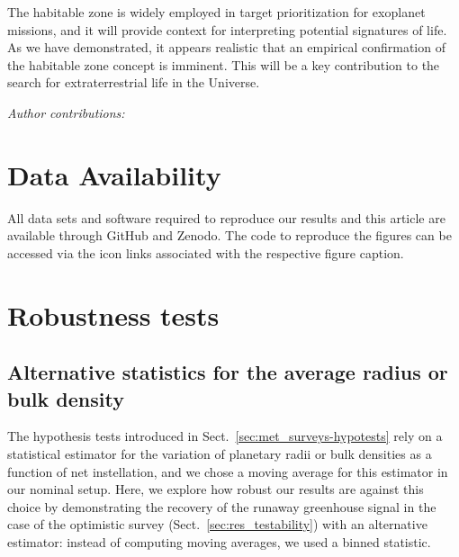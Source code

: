 \documentclass[twocolumn]{aastex631}
\begin{document}
The habitable zone is widely employed in target prioritization for exoplanet missions, and it will provide context for interpreting potential signatures of life.
As we have demonstrated, it appears realistic that an empirical confirmation of the habitable zone concept is imminent.
This will be a key contribution to the search for extraterrestrial life in the Universe.


\begin{large}\textit{Author contributions:}\end{large}

\section*{Data Availability}
All data sets and software required to reproduce our results and this article are available through GitHub and Zenodo.
The code to reproduce the figures can be accessed via the icon links associated with the respective figure caption.




\appendix
\section{Robustness tests}
\subsection{Alternative statistics for the average radius or bulk density}\label{app:binnedstats}
The hypothesis tests introduced in Sect.~\ref{sec:met_surveys-hypotests} rely on a statistical estimator for the variation of planetary radii or bulk densities as a function of net instellation, and we chose a moving average for this estimator in our nominal setup.
Here, we explore how robust our results are against this choice by demonstrating the recovery of the runaway greenhouse signal in the case of the optimistic survey (Sect.~\ref{sec:res_testability}) with an alternative estimator: instead of computing moving averages, we used a binned statistic.
\end{document}
